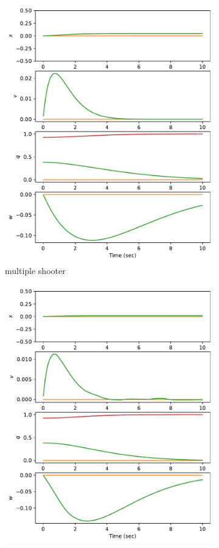 \documentclass[]{article}
\begin{document}
\begin{figure}[H]
\begin{subfigure}[b]{0.3\textwidth}
		\includegraphics[width=\textwidth]{figures/state45dz3.pdf}
		\caption{multiple shooter}
	\end{subfigure}
	\begin{subfigure}[b]{0.3\textwidth}
		\centering
		\includegraphics[width=\textwidth]{figures/state45dz2.pdf}

\end{subfigure}
\end{figure}
\end{document}
